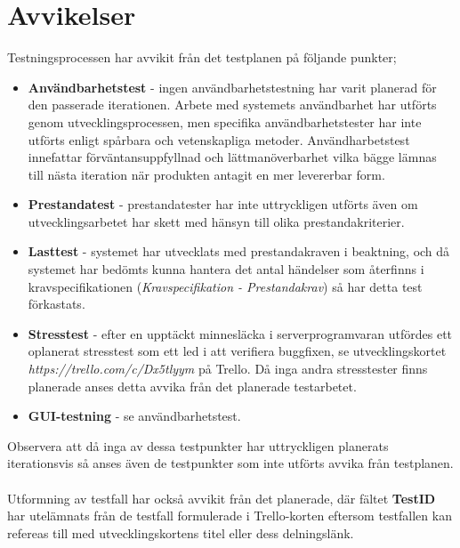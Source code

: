 \section{Avvikelser}
Testningsprocessen har avvikit från det testplanen på följande punkter; 

\begin{itemize}
\item \textbf{Användbarhetstest} - ingen användbarhetstestning har varit planerad för den passerade iterationen. Arbete med systemets användbarhet har utförts genom utvecklingsprocessen, men specifika användbarhetstester har inte utförts enligt spårbara och vetenskapliga metoder. Användharbetstest innefattar förväntansuppfyllnad och lättmanöverbarhet vilka bägge lämnas till nästa iteration när produkten antagit en mer levererbar form. 
\item \textbf{Prestandatest} - prestandatester har inte uttryckligen utförts även om utvecklingsarbetet har skett med hänsyn till olika prestandakriterier.
\item \textbf{Lasttest} - systemet har utvecklats med prestandakraven i beaktning, och då systemet har bedömts kunna hantera det antal händelser som återfinns i kravspecifikationen (\textit{Kravspecifikation - Prestandakrav}) så har detta test förkastats.
\item \textbf{Stresstest} - efter en upptäckt minnesläcka i serverprogramvaran utfördes ett oplanerat stresstest som ett led i att verifiera buggfixen, se utvecklingskortet \textit{https://trello.com/c/Dx5tlyym} på Trello. Då inga andra stresstester finns planerade anses detta avvika från det planerade testarbetet. 
\item \textbf{GUI-testning} - se användbarhetstest.
\end{itemize}
\medskip
Observera att då inga av dessa testpunkter har uttryckligen planerats iterationsvis så anses även de testpunkter som inte utförts avvika från testplanen.\\
\\
Utformning av testfall har också avvikit från det planerade, där fältet \textbf{TestID} har utelämnats från de testfall formulerade i Trello-korten eftersom testfallen kan refereas till med utvecklingskortens titel eller dess delningslänk.